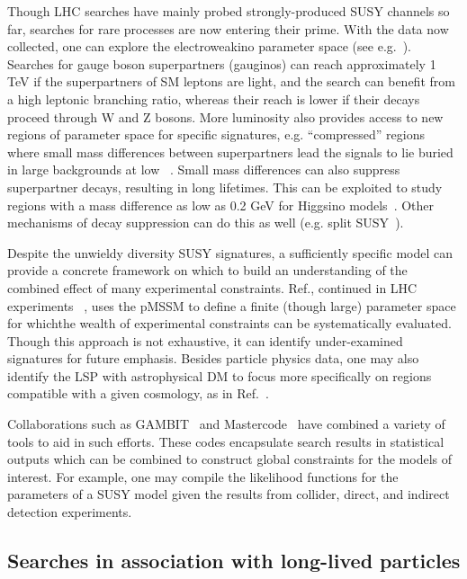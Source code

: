 Though LHC searches have mainly probed strongly-produced SUSY channels so far, searches for rare processes are now entering their prime.
With the data now collected, one can explore the electroweakino parameter space (see e.g.~\cite{Sirunyan:2018ubx,ATLAS:2017uun}).
Searches for gauge boson superpartners (gauginos) can reach approximately 1 TeV if the superpartners of SM leptons are light, and the search can benefit from a high leptonic branching ratio, whereas their reach is lower if their decays proceed through W and Z bosons. %
More luminosity also provides access to new regions of parameter space for specific signatures, e.g. ``compressed'' regions where small mass differences between superpartners lead the signals to lie buried in large backgrounds at low \MET~\cite{Aaboud:2017leg,Sirunyan:2017zss}.
Small mass differences can also suppress superpartner decays, resulting in long lifetimes. This can be exploited to study regions with a mass difference as low as 0.2 GeV for Higgsino models~\cite{ATL-PHYS-PUB-2017-019}.
Other mechanisms of decay suppression can do this as well (e.g. split SUSY~\cite{Sirunyan:2018vjp}). 

Despite the unwieldy diversity SUSY signatures, a sufficiently specific model can provide a concrete framework on which to build an understanding of the combined effect of many experimental constraints. Ref.\cite{Conley:2010du}, continued in LHC experiments ~\cite{Aad:2015baa, Khachatryan:2016nvf}, uses the pMSSM to define a finite (though large) parameter space for whichthe  wealth of experimental constraints can be systematically evaluated.
Though this approach is not exhaustive, it can identify under-examined signatures for future emphasis.
Besides particle physics data, one may also identify the LSP with astrophysical DM to focus more specifically on regions compatible with a given cosmology, as in Ref.~\cite{Aaboud:2016wna}.

Collaborations such as GAMBIT~\cite{Athron:2017ard} and Mastercode~\cite{Bagnaschi:2017tru} have combined a variety of tools to aid in such efforts.
These codes encapsulate search results in statistical outputs which can be combined to construct global constraints for the models of interest. 
For example, one may compile the likelihood functions for the parameters of a SUSY model given the results from collider, direct, and indirect detection experiments.

\subsection{Searches in association with long-lived particles}
\label{sec:results_LLPSearches}

